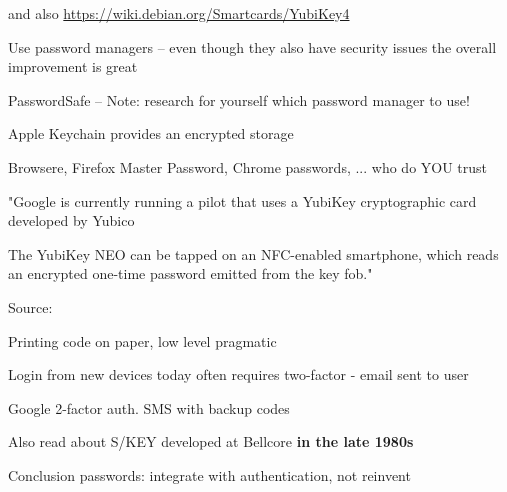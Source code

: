 \documentclass[Screen16to9,17pt]{foils}
\begin{document}
 and also \url{https://wiki.debian.org/Smartcards/YubiKey4}




\begin{list1}
\item Use password managers -- even though they also have security issues the overall improvement is great
\item PasswordSafe  -- Note: research for yourself which password manager to use!
\item Apple Keychain provides an encrypted storage
\item Browsere, Firefox Master Password, Chrome passwords, ... who do YOU trust
\end{list1}



"Google is currently running a pilot that uses a YubiKey cryptographic card developed by Yubico

The YubiKey NEO can be tapped on an NFC-enabled smartphone, which reads an encrypted one-time password emitted from the key fob."

{\footnotesize Source:
}


\centerline{\Large Printing code on paper, low level pragmatic }


\begin{list1}
\item Login from new devices today often requires two-factor - email sent to user
\item Google 2-factor auth. SMS with backup codes
\item Also read about S/KEY developed at Bellcore {\bf in the late 1980s}\\ 
\end{list1}

\centerline{Conclusion passwords: integrate with authentication, not reinvent}

\end{document}
